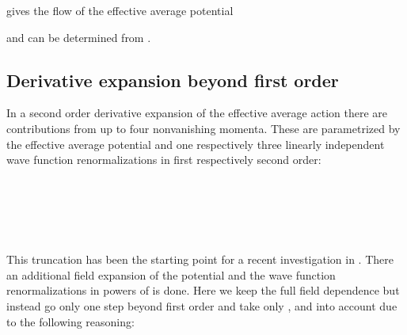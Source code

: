 \documentclass[a4paper,aps,prl,twocolumn,groupedaddress]{revtex4}
\begin{document}
\bigskip {}\coordHE{}

\bigskip
\noindent
gives the flow of the effective average potential

\bigskip {}\coordHE{}

\bigskip
\noindent
and \coordHE{} can be determined from \coordHE{}.





\newpage
\subsection*{Derivative expansion beyond first order}

\noindent
In a second order derivative expansion of the effective average action there are
contributions from up to four nonvanishing momenta. These are parametrized by the
effective average potential and one respectively three linearly independent wave
function renormalizations in first respectively second order:

\bigskip {}\coordHE{}\\
\coordHE{}\\
\coordHE{}\\
\coordHE{}\\
\coordHE{}

\bigskip
\noindent
This truncation has been the starting point for a recent investigation in \cite{Lit5a}. There an additional field expansion of the potential and 
the wave function renormalizations in powers of \myHighlight{$\rho$}\coordHE{} is done. Here we keep the full field dependence but instead go 
only one step beyond first order and take only \coordHE{}, \coordHE{} and \coordHE{} into account due to the following reasoning:
\end{document}
